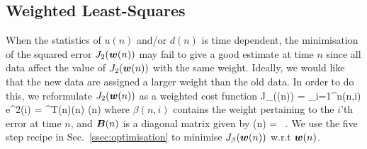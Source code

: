 \subsection{Weighted Least-Squares}
When the statistics of $u(n)$ and/or $d(n)$ is time dependent, the minimisation of the squared error $J_2(\boldsymbol{w}(n))$ may fail to give a good estimate at time $n$ since all data affect the value of $J_2(\boldsymbol{w}(n))$ with the same weight. Ideally, we would like that the new data are assigned a larger weight than the old data. In order to do this, we reformulate $J_2(\boldsymbol{w}(n))$ as a weighted cost function
\bmath
  J_\beta((n)) = \sum_{i=1}^{n}\beta(n,i) e^2(i) = ^T(n)(n) (n)
\emath
where $\beta(n,i)$ contains the weight pertaining to the $i$'th error at time $n$, and $\boldsymbol{B}(n)$ is a diagonal matrix given by
\bmath
  (n) = \ .
\emath
We use the five step recipe in Sec.~\ref{ssec:optimisation} to minimise $J_\beta(\boldsymbol{w}(n))$ w.r.t $\boldsymbol{w}(n)$.
